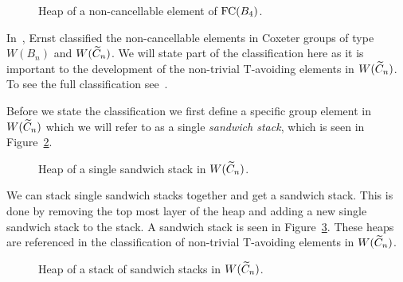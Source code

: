 \begin{figure*}[h!] \centering
{}	
\caption{Heap of a non-cancellable element of $\mathrm{FC}(B_4)$.}\label{fig:noncancelvisual}
\end{figure*}

In~\cite{Ernst2010}, Ernst classified the non-cancellable elements in Coxeter groups of type $W(B_n)$ and $W(\widetilde{C}_n)$. We will state part of the classification here as it is important to the development of the non-trivial T-avoiding elements in $W(\widetilde{C}_n)$. To see the full classification see~\cite[Sections 4.2 and 5]{Ernst2010}. 

Before we state the classification we first define a specific group element in $W(\widetilde{C}_n)$ which we will refer to as a single \emph{sandwich stack}, which is seen in Figure~\ref{fig:singsandstack}.

\begin{figure}[h!] \centering
{}
\caption{Heap of a single sandwich stack in $W(\widetilde{C}_n)$.}\label{fig:singsandstack}
\end{figure}

We can stack single sandwich stacks together and get a sandwich stack. This is done by removing the top most layer of the heap and adding a new single sandwich stack to the stack. A sandwich stack is seen in Figure~\ref{fig:stacksandstack}. These heaps are referenced in the classification of non-trivial T-avoiding elements in $W(\widetilde{C}_n)$.

\begin{figure}[h!] \centering
{}	
\caption{Heap of a stack of sandwich stacks in $W(\widetilde{C}_n)$.}\label{fig:stacksandstack}
\end{figure}

